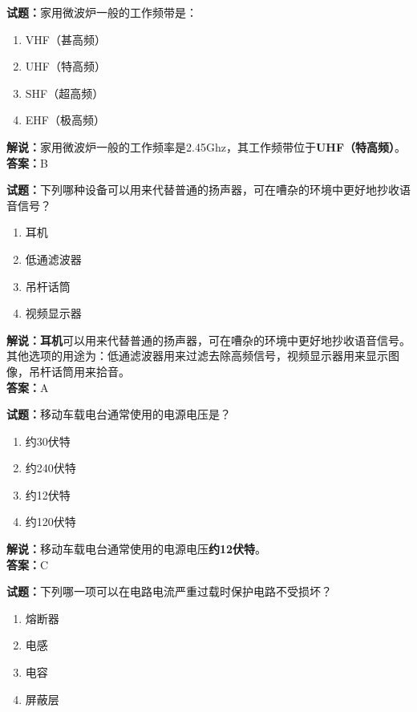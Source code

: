 \documentclass{ctexbook}
\begin{document}
\bigskip


\noindent\textbf{试题：}家用微波炉一般的工作频带是：

\begin{enumerate}[leftmargin=3em]
	\item VHF（甚高频）
	\item UHF（特高频）
	\item SHF（超高频）
	\item EHF（极高频）
\end{enumerate}

\noindent\textbf{解说：}家用微波炉一般的工作频率是2.45Ghz，其工作频带位于\textbf{UHF（特高频）}。\\\noindent\textbf{答案：}B


\bigskip


\noindent\textbf{试题：}下列哪种设备可以用来代替普通的扬声器，可在嘈杂的环境中更好地抄收语音信号？

\begin{enumerate}[leftmargin=3em]
	\item 耳机
	\item 低通滤波器
	\item 吊杆话筒
	\item 视频显示器
\end{enumerate}

\noindent\textbf{解说：耳机}可以用来代替普通的扬声器，可在嘈杂的环境中更好地抄收语音信号。其他选项的用途为：低通滤波器用来过滤去除高频信号，视频显示器用来显示图像，吊杆话筒用来拾音。\\\noindent\textbf{答案：}A

\bigskip


\noindent\textbf{试题：}移动车载电台通常使用的电源电压是？

\begin{enumerate}[leftmargin=3em]
	\item 约30伏特
	\item 约240伏特
	\item 约12伏特
	\item 约120伏特
\end{enumerate}

\noindent\textbf{解说：}移动车载电台通常使用的电源电压\textbf{约12伏特}。\\\noindent\textbf{答案：}C

\bigskip


\noindent\textbf{试题：}下列哪一项可以在电路电流严重过载时保护电路不受损坏？

\begin{enumerate}[leftmargin=3em]
	\item 熔断器
	\item 电感
	\item 电容
	\item 屏蔽层
\end{enumerate}
\end{document}
